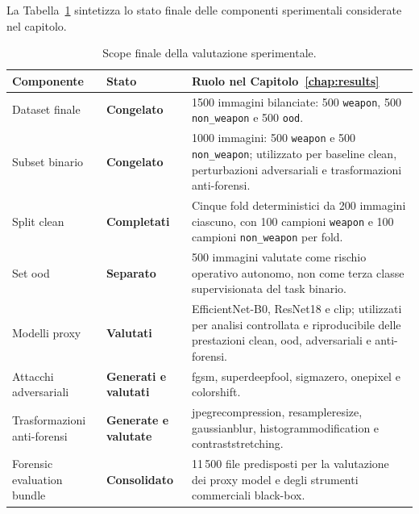 La Tabella~\ref{tab:results-evaluation-scope} sintetizza lo stato finale delle
componenti sperimentali considerate nel capitolo.

\begin{table}[H]
\centering
\scriptsize
\renewcommand{\arraystretch}{1.15}
\setlength{\tabcolsep}{4pt}
\caption{Scope finale della valutazione sperimentale.}
\label{tab:results-evaluation-scope}
\begin{tabularx}{\textwidth}{@{}p{} p{} X@{}}
\toprule
\textbf{Componente} & \textbf{Stato} & \textbf{Ruolo nel Capitolo~\ref{chap:results}} \\
\midrule

Dataset finale &
\textbf{Congelato} &
1500 immagini bilanciate: 500 \texttt{weapon}, 500 \texttt{non\_weapon} e
500 \texttt{ood}. \\

Subset binario &
\textbf{Congelato} &
1000 immagini: 500 \texttt{weapon} e 500 \texttt{non\_weapon}; utilizzato per
baseline clean, perturbazioni adversariali e trasformazioni anti-forensi. \\

Split clean &
\textbf{Completati} &
Cinque fold deterministici da 200 immagini ciascuno, con 100 campioni
\texttt{weapon} e 100 campioni \texttt{non\_weapon} per fold. \\

Set \gls{ood} &
\textbf{Separato} &
500 immagini valutate come rischio operativo autonomo, non come terza classe
supervisionata del task binario. \\

Modelli proxy &
\textbf{Valutati} &
EfficientNet-B0, ResNet18 e \gls{clip}; utilizzati per analisi controllata e
riproducibile delle prestazioni clean, \gls{ood}, adversariali e anti-forensi. \\

Attacchi adversariali &
\textbf{Generati e valutati} &
\gls{fgsm}, \gls{superdeepfool}, \gls{sigmazero}, \gls{onepixel} e
\gls{colorshift}. \\

Trasformazioni anti-forensi &
\textbf{Generate e valutate} &
\gls{jpegrecompression}, \gls{resampleresize}, \gls{gaussianblur},
\gls{histogrammodification} e \gls{contraststretching}. \\

Forensic evaluation bundle &
\textbf{Consolidato} &
11\,500 file predisposti per la valutazione dei proxy model e degli strumenti
commerciali black-box. \\


\end{tabularx}
\end{table}
